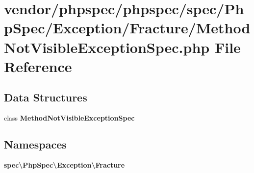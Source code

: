 \section{vendor/phpspec/phpspec/spec/\+Php\+Spec/\+Exception/\+Fracture/\+Method\+Not\+Visible\+Exception\+Spec.php File Reference}
\label{_method_not_visible_exception_spec_8php}
\subsection*{Data Structures}
\begin{DoxyCompactItemize}
\item 
class {\bf Method\+Not\+Visible\+Exception\+Spec}
\end{DoxyCompactItemize}
\subsection*{Namespaces}
\begin{DoxyCompactItemize}
\item 
 {\bf spec\textbackslash{}\+Php\+Spec\textbackslash{}\+Exception\textbackslash{}\+Fracture}
\end{DoxyCompactItemize}
